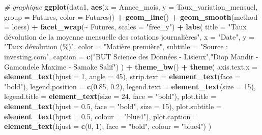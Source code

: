 \documentclass[
]{article}
\newenvironment{Shaded}{\begin{snugshade}}{\end{snugshade}}
\newcommand{\AttributeTok}[1]{\textcolor[rgb]{0.13,0.29,0.53}{#1}}
\newcommand{\CommentTok}[1]{\textcolor[rgb]{0.56,0.35,0.01}{\textit{#1}}}
\newcommand{\DecValTok}[1]{\textcolor[rgb]{0.00,0.00,0.81}{#1}}
\newcommand{\FloatTok}[1]{\textcolor[rgb]{0.00,0.00,0.81}{#1}}
\newcommand{\FunctionTok}[1]{\textcolor[rgb]{0.13,0.29,0.53}{\textbf{#1}}}
\newcommand{\NormalTok}[1]{#1}
\newcommand{\SpecialCharTok}[1]{\textcolor[rgb]{0.81,0.36,0.00}{\textbf{#1}}}
\newcommand{\StringTok}[1]{\textcolor[rgb]{0.31,0.60,0.02}{#1}}
\begin{document}
\begin{Shaded}
\begin{Highlighting}[]
\CommentTok{\# graphique}
\FunctionTok{ggplot}\NormalTok{(data1, }\FunctionTok{aes}\NormalTok{(}\AttributeTok{x =}\NormalTok{ Annee\_mois, }\AttributeTok{y =}\NormalTok{ Taux\_variation\_mensuel, }\AttributeTok{group =}\NormalTok{ Futures, }\AttributeTok{color =}\NormalTok{ Futures)) }\SpecialCharTok{+}
  \FunctionTok{geom\_line}\NormalTok{() }\SpecialCharTok{+}
  \FunctionTok{geom\_smooth}\NormalTok{(}\AttributeTok{method =} \StringTok{\textquotesingle{}loess\textquotesingle{}}\NormalTok{) }\SpecialCharTok{+}
  \FunctionTok{facet\_wrap}\NormalTok{(}\SpecialCharTok{\textasciitilde{}}\NormalTok{ Futures, }\AttributeTok{scales =} \StringTok{"free\_y"}\NormalTok{) }\SpecialCharTok{+}
  \FunctionTok{labs}\NormalTok{(}
    \AttributeTok{title =} \StringTok{"Taux d\textquotesingle{}évolution de la moyenne mensuelle des cotations journalières"}\NormalTok{,}
    \AttributeTok{x =} \StringTok{"Date"}\NormalTok{,}
    \AttributeTok{y =} \StringTok{"Taux d\textquotesingle{}évolution (\%)"}\NormalTok{,}
    \AttributeTok{color =} \StringTok{"Matière première"}\NormalTok{,}
    \AttributeTok{subtitle =} \StringTok{"Source : investing.com"}\NormalTok{,}
    \AttributeTok{caption =} \FunctionTok{c}\NormalTok{(}\StringTok{"BUT Science des Données {-} Lisieux"}\NormalTok{,}\StringTok{"Diop Mandir {-} Gamondele Maxime {-} Samake Salif"}\NormalTok{)}
\NormalTok{  ) }\SpecialCharTok{+}
  \FunctionTok{theme\_bw}\NormalTok{() }\SpecialCharTok{+}
  \FunctionTok{theme}\NormalTok{(}
    \AttributeTok{axis.text.x =} \FunctionTok{element\_text}\NormalTok{(}\AttributeTok{hjust =} \DecValTok{1}\NormalTok{, }\AttributeTok{angle =} \DecValTok{45}\NormalTok{),}
    \AttributeTok{strip.text =} \FunctionTok{element\_text}\NormalTok{(}\AttributeTok{face =} \StringTok{"bold"}\NormalTok{), }
    \AttributeTok{legend.position =} \FunctionTok{c}\NormalTok{(}\FloatTok{0.85}\NormalTok{, }\FloatTok{0.2}\NormalTok{),  }
    \AttributeTok{legend.text =} \FunctionTok{element\_text}\NormalTok{(}\AttributeTok{size =} \DecValTok{15}\NormalTok{),}
    \AttributeTok{legend.title =} \FunctionTok{element\_text}\NormalTok{(}\AttributeTok{size =} \DecValTok{24}\NormalTok{, }\AttributeTok{face =} \StringTok{"bold"}\NormalTok{),}
    \AttributeTok{plot.title =} \FunctionTok{element\_text}\NormalTok{(}\AttributeTok{hjust =} \FloatTok{0.5}\NormalTok{, }\AttributeTok{face =} \StringTok{"bold"}\NormalTok{, }\AttributeTok{size =} \DecValTok{15}\NormalTok{),}
    \AttributeTok{plot.subtitle =} \FunctionTok{element\_text}\NormalTok{(}\AttributeTok{hjust =} \FloatTok{0.5}\NormalTok{, }\AttributeTok{colour =} \StringTok{"blue4"}\NormalTok{),}
    \AttributeTok{plot.caption =} \FunctionTok{element\_text}\NormalTok{(}\AttributeTok{hjust =} \FunctionTok{c}\NormalTok{(}\DecValTok{0}\NormalTok{, }\DecValTok{1}\NormalTok{), }\AttributeTok{face =} \StringTok{"bold"}\NormalTok{, }\AttributeTok{colour =} \StringTok{"blue4"}\NormalTok{)}
\NormalTok{  )}
\end{Highlighting}
\end{Shaded}
\end{document}
